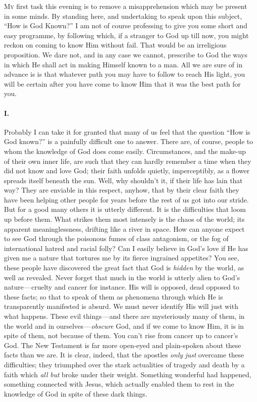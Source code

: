 \documentclass[12pt]{article}
\begin{document}
\textsc{My} first task this evening is to remove a misapprehension which may be
present in some minds. By standing here, and undertaking to speak upon
this subject, ``How is God Known?'' I am not of course professing to
give you some short and easy programme, by following which, if a
stranger to God up till now, you might reckon on coming to know Him
without fail. That would be an irreligious proposition. We dare not, and
in any case we cannot, prescribe to God the ways in which He shall act
in making Himself known to a man. All we are sure of in advance is is
that whatever path you may have to follow to reach His light, you will
be certain after you have come to know Him that it was the best path for
you.

\paragraph{I.}\label{4039}

Probably I can take it for granted that many of us feel that the
question ``How is God known?'' is a painfully difficult one to answer.
There are, of course, people to whom the knowledge of God does come
easily. Circumstances, and the make-up of their own inner life, are such
that they can hardly remember a time when they did not know and love
God; their faith unfolds quietly, imperceptibly, as a flower spreads
itself beneath the sun. Well, why shouldn't it, if their life has lain
that way? They are enviable in this respect, anyhow, that by their clear
faith they have been helping other people for years before the rest of
us got into our stride. But for a good many others it is utterly
different. It is the difficulties that loom up before them. What strikes
them most intensely is the chaos of the world; its apparent
meaninglessness, drifting like a river in space. How can anyone expect
to see God through the poisonous fumes of class antagonism, or the fog
of international hatred and racial folly? Can I easily believe in God's
love if He has given me a nature that tortures me by its fierce
ingrained appetites? You see, these people have discovered the great
fact that God is \emph{hidden} by the world, as well as revealed. Never
forget that much in the world is utterly alien to God's
nature --- cruelty and cancer for instance. His will is opposed, dead
opposed to these facts; so that to speak of them as phenomena through
which He is transparently manifested is absurd. We must never identify
His will just with what happens. These evil things --- and there are
mysteriously many of them, in the world and in
ourselves --- \emph{obscure} God, and if we come to know Him, it is in
spite of them, not because of them. You can't rise from cancer up to
cancer's God. The New Testament is far more open-eyed and plain-spoken
about these facts than we are. It is clear, indeed, that the apostles
\emph{only} \emph{just} overcame these difficulties; they triumphed over
the stark actualities of tragedy and death by a faith which \emph{all
but} broke under their weight. Something wonderful had happened,
something connected with Jesus, which actually enabled them to rest in
the knowledge of God in spite of these dark things.
\end{document}
